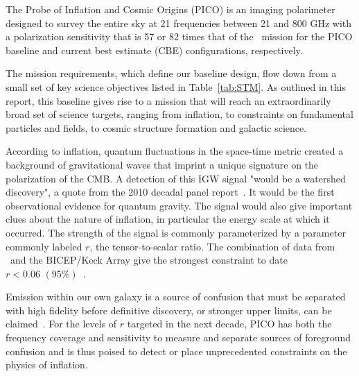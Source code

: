 \documentclass[PICOReport.tex]{subfiles}
\begin{document}
The Probe of Inflation and Cosmic Origins (PICO) is an imaging polarimeter designed to survey the entire sky at 21 frequencies between 21 and 800 GHz with a polarization sensitivity that is 57 or 82 times that of the \planck\ mission for the PICO baseline and current best estimate (\ac{CBE}) configurations, respectively. 

The mission requirements, which define our baseline design, flow down from a small set of key science objectives listed in Table~\ref{tab:STM}. As outlined in this report, this baseline gives rise to a mission that will reach an extraordinarily broad set of science targets, ranging from inflation, to constraints on fundamental particles and fields, to cosmic structure formation and galactic science.

According to inflation, quantum fluctuations in the space-time metric created a background of gravitational waves that imprint a unique signature on the polarization of the CMB. A detection of this \ac{IGW} signal "would be a watershed discovery", a quote from the 2010 decadal panel report~\citep{blandford2010}. It would be the first observational evidence for quantum gravity. The signal would also give important clues about the nature of inflation, in particular the energy scale at which it occurred. The strength of the signal is commonly parameterized by a parameter commonly labeled $r$, the tensor-to-scalar ratio. The combination of data from \planck\ and the BICEP/Keck Array give the strongest constraint to date $r<0.06\,\, (95\%)$~\citep{2018arXiv181005216A}.

Emission within our own galaxy is a source of confusion that must be separated with high fidelity before definitive discovery, or stronger upper limits, can be claimed~\citep{2016A&A...586A.133P}. For the levels of $r$ targeted in the next decade, PICO has both the frequency coverage and sensitivity to measure and separate sources of foreground confusion and is thus poised to detect or place unprecedented constraints on the physics of inflation. 

\end{document}
